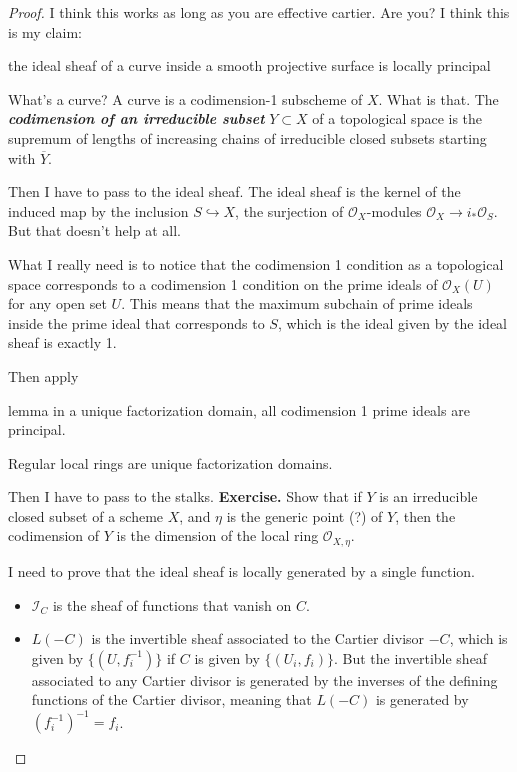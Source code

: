 \begin{proof}\leavevmode
	I think this works as long as you are effective cartier. Are you? I think this is my claim:
	\begin{tcolorbox}[colback=white,colframe=black,boxrule=0.5pt,sharp corners]
	the ideal sheaf of a curve inside a smooth projective surface is locally principal
	\end{tcolorbox}
What's a curve? A curve is a codimension-1 subscheme of \(X\). What is that. The \textit{\textbf{codimension of an irreducible subset}} \(Y \subset X\) of a topological space is the supremum of lengths of increasing chains of irreducible closed subsets starting with \(\overline{Y}\).

Then I have to pass to the ideal sheaf. The ideal sheaf is the kernel of the induced map by the inclusion \(S \hookrightarrow X\), the surjection of \(\mathcal{O}_X\)-modules \(\mathcal{O}_X \to i_* \mathcal{O}_S\). But that doesn't help at all.

What I really need is to notice that the codimension 1 condition as a topological space corresponds to a codimension 1 condition on the prime ideals of \(\mathcal{O}_X(U)\) for any open set \(U\). This means that the maximum subchain of prime ideals inside the prime ideal that corresponds to \(S\), which is the ideal given by the ideal sheaf is exactly 1.

Then apply
\begin{thing7}{lemma}\leavevmode
in a unique factorization domain, all codimension 1 prime ideals are principal.
\end{thing7}

Regular local rings are unique factorization domains.

Then I have to pass to the stalks. \textbf{Exercise.} Show that if \(Y\) is an irreducible closed subset of a scheme \(X\), and \(\eta\) is the generic point (?) of \(Y\), then the codimension of \(Y\) is the dimension of the local ring \(\mathcal{O}_{X,\eta}\).


	I need to prove that the ideal sheaf is locally generated by a single function. 
	\begin{itemize}
\item \(\mathcal{I}_C\) is the sheaf of functions that vanish on \(C\).
\item \(L(-C)\) is the invertible sheaf associated to the Cartier divisor \(-C\), which is given by \(\{(U,f_i^{-1})\}\) if \(C\) is given by \(\{(U_i,f_i)\}\). But the invertible sheaf associated to any Cartier divisor is generated by the inverses of the defining functions of the Cartier divisor, meaning that \(L(-C)\) is generated by \((f_i^{-1})^{-1}=f_i\).
\end{itemize}
\end{proof}

